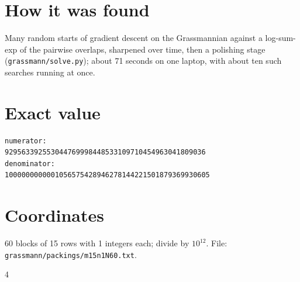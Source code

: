 \documentclass[11pt,a4paper]{article}
\begin{document}
\section{How it was found}
Many random starts of gradient descent on the Grassmannian against a log-sum-exp of the pairwise overlaps, sharpened over time, then a polishing stage (\texttt{grassmann/solve.py}); about 71 seconds on one laptop, with about ten such searches running at once.


\appendix
\section{Exact value}
{\small
\begin{verbatim}
numerator:
929563392553044769998448533109710454963041809036
denominator:
1000000000001056575428946278144221501879369930605
\end{verbatim}}

\section{Coordinates}
60 blocks of 15 rows with 1 integers each; divide by $10^{12}$. File: \texttt{grassmann/packings/m15n1N60.txt}.
{\tiny
\begin{multicols}{4}
\end{multicols}}
\end{document}
